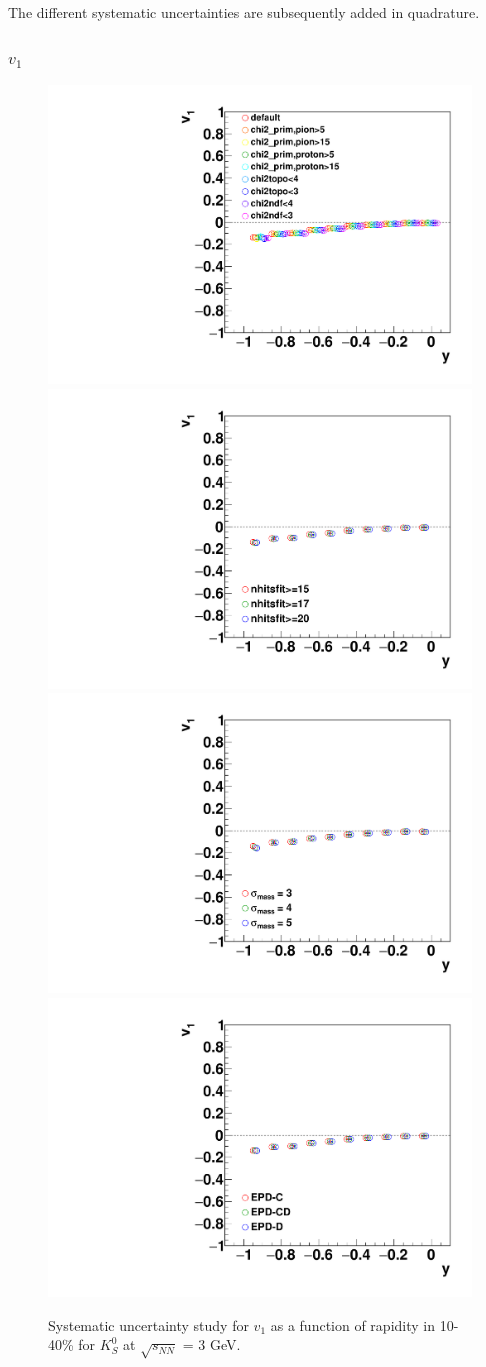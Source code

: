 The different systematic uncertainties are subsequently added in quadrature. 

\subsubsection{$v_1$}

\begin{figure}[h]
\includegraphics[width=0.49\linewidth]{chapterX/fig/ks_sys_cut_v1.pdf}
\includegraphics[width=0.49\linewidth]{chapterX/fig/ks_sys_cut_v1_nhits.pdf}
\includegraphics[width=0.49\linewidth]{FXT3gev/chapterX/fig/ks_sys_cut_v1_msigma.pdf}
\includegraphics[width=0.49\linewidth]{FXT3gev/chapterX/fig/ks_sys_cut_v1_epdres.pdf}
\caption{Systematic uncertainty study for $v_{1}$ as a function of rapidity in 10-40\% for $K^0_S$ at $\sqrt{s_{NN}}$ = 3 GeV.}
\label{ks_v1y_sys}
\end{figure}

